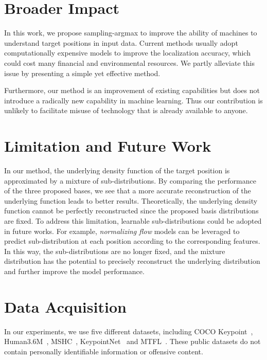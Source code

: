 \documentclass{article}
\begin{document}
\section{Broader Impact}
\label{sec:impact}

In this work, we propose sampling-argmax to improve the ability of machines to understand target positions in input data. Current methods usually adopt computationally expensive models to improve the localization accuracy, which could cost many financial and environmental resources. We partly alleviate this issue by presenting a simple yet effective method.

Furthermore, our method is an improvement of existing capabilities but does not introduce a radically new capability in machine learning. Thus our contribution is unlikely to facilitate misuse of technology that is already available to anyone.
 

\section{Limitation and Future Work}
\label{sec:limit}



In our method, the underlying density function of the target position is approximated by a mixture of sub-distributions. By comparing the performance of the three proposed bases, we see that a more accurate reconstruction of the underlying function leads to better results. 
Theoretically, the underlying density function cannot be perfectly reconstructed since the proposed basis distributions are fixed. To address this limitation, learnable sub-distributions could be adopted in future works. For example, \textit{normalizing flow} models can be leveraged to predict sub-distribution at each position according to the corresponding features. In this way, the sub-distributions are no longer fixed, and the mixture distribution has the potential to precisely reconstruct the underlying distribution and further improve the model performance.



%
 


\section{Data Acquisition}
\label{sec:data}

In our experiments, we use five different datasets, including COCO Keypoint~\cite{mscoco}, Human3.6M~\cite{h36m}, MSHC~\cite{he2019retinal}, KeypointNet~\cite{you2020keypointnet} and MTFL~\cite{zhang2014facial}. These public datasets do not contain personally identifiable information or offensive content.
\end{document}
